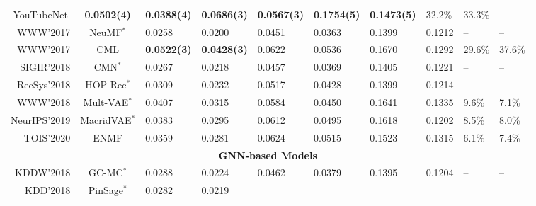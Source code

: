 \documentclass[sigconf,authorversion]{acmart}
\begin{document}
\begin{table*}[!t]
\begin{tabular}{rcllllllll}
  \multicolumn{1}{c|}{YouTubeNet} &
  \textbf{0.0502(4)} &
  \multicolumn{1}{l|}{\textbf{0.0388(4)}} &
  \textbf{0.0686(3)} &
  \multicolumn{1}{l|}{\textbf{0.0567(3)}} &
  \textbf{0.1754(5)} &
  \multicolumn{1}{l|}{\textbf{0.1473(5)}} &
  32.2\% &
  33.3\% \\
\multicolumn{1}{r|}{WWW'2017} &
  \multicolumn{1}{c|}{NeuMF$^\ast$} &
  0.0258 &
  \multicolumn{1}{l|}{0.0200} &
  0.0451 &
  \multicolumn{1}{l|}{0.0363} &
  0.1399 &
  \multicolumn{1}{l|}{0.1212} &
  -- &
  -- \\
\multicolumn{1}{r|}{WWW'2017} &
  \multicolumn{1}{c|}{CML} &
  \textbf{0.0522(3)} &
  \multicolumn{1}{l|}{\textbf{0.0428(3)}} &
  0.0622 &
  \multicolumn{1}{l|}{0.0536} &
  0.1670 &
  \multicolumn{1}{l|}{0.1292} &
  29.6\% &
  37.6\% \\
\multicolumn{1}{r|}{SIGIR'2018} &
  \multicolumn{1}{c|}{CMN$^\ast$} &
  0.0267 &
  \multicolumn{1}{l|}{0.0218} &
  0.0457 &
  \multicolumn{1}{l|}{0.0369} &
  0.1405 &
  \multicolumn{1}{l|}{0.1221} &
  -- &
  -- \\
\multicolumn{1}{r|}{RecSys'2018} &
  \multicolumn{1}{c|}{HOP-Rec$^\ast$} &
  0.0309 &
  \multicolumn{1}{l|}{0.0232} &
  0.0517 &
  \multicolumn{1}{l|}{0.0428} &
  0.1399 &
  \multicolumn{1}{l|}{0.1214} &
  -- &
  -- \\
\multicolumn{1}{r|}{WWW'2018} &
  \multicolumn{1}{c|}{Mult-VAE$^\ast$} &
  0.0407 &
  \multicolumn{1}{l|}{0.0315} &
  0.0584 &
  \multicolumn{1}{l|}{0.0450} &
  0.1641 &
  \multicolumn{1}{l|}{0.1335} &
  9.6\% &
  7.1\% \\
\multicolumn{1}{r|}{NeurIPS'2019} &
  \multicolumn{1}{c|}{MacridVAE$^\ast$} &
  0.0383 &
  \multicolumn{1}{l|}{0.0295} &
  0.0612 &
  \multicolumn{1}{l|}{0.0495} &
  0.1618 &
  \multicolumn{1}{l|}{0.1202} &
  8.5\% &
  8.0\% \\
\multicolumn{1}{r|}{TOIS'2020} &
  \multicolumn{1}{c|}{ENMF} &
  0.0359 &
  \multicolumn{1}{l|}{0.0281} &
  0.0624 &
  \multicolumn{1}{l|}{0.0515} &
  0.1523 &
  \multicolumn{1}{l|}{0.1315} &
  6.1\% &
  7.4\% \\ \hline
\multicolumn{10}{c}{\cellcolor[HTML]{F8F8F8}\textbf{GNN-based Models}} \\ \hline
\multicolumn{1}{r|}{KDDW'2018} &
  \multicolumn{1}{c|}{GC-MC$^\ast$} &
  0.0288 &
  \multicolumn{1}{l|}{0.0224} &
  0.0462 &
  \multicolumn{1}{l|}{0.0379} &
  0.1395 &
  \multicolumn{1}{l|}{0.1204} &
  -- &
  -- \\
\multicolumn{1}{r|}{KDD'2018} &
  \multicolumn{1}{c|}{PinSage$^\ast$} &
  0.0282 &
  \multicolumn{1}{l|}{0.0219} &

\end{tabular}
\end{table*}
\end{document}

